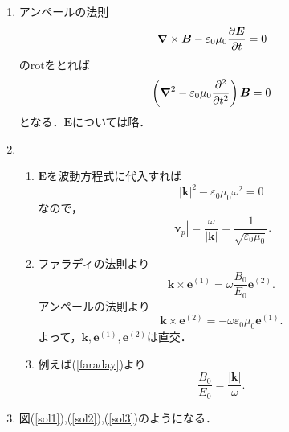 \documentclass[a4paper,pdflatex,ja=standard]{bxjsarticle}
\begin{document}
\begin{enumerate}
  \item 
  アンペールの法則
  \begin{equation}
    \bm{\nabla}
    \times
    \bm{B}
    -
    \varepsilon_{0}\mu_{0}
    \pdv{\bm{E}}{t}
    =
    0
  \end{equation}
  の$\text{rot}$をとれば
  \begin{equation}
    \left(  
      \bm{\nabla}^2
      -
      \varepsilon_{0}\mu_{0}
      \pdv[2]{}{t}
    \right)
    \bm{B}
    =
    0
  \end{equation}
  となる．$\bm{E}$については略．

  \item 
  \begin{enumerate}
    \item 
    $\bm{E}$を波動方程式に代入すれば
    \begin{equation}
      |\bm{k}|^2
      -
      \varepsilon_{0}\mu_{0}\omega^2
      =
      0
    \end{equation}
    なので，
    \begin{equation}
      |\bm{v}_{p}|
      =
      \frac{\omega}{|\bm{k}|}
      =
      \frac{1}{\sqrt{\varepsilon_{0}\mu_{0}}}
      .
    \end{equation}

    \item 
    ファラディの法則より
    \begin{equation}
      \bm{k}
      \times
      \bm{e}^{(1)}
      =
      \omega
      \frac{B_{0}}{E_{0}}
      \bm{e}^{(2)}
      .
      \label{faraday}
    \end{equation}
    アンペールの法則より
    \begin{equation}
      \bm{k}
      \times
      \bm{e}^{(2)}
      =
      -
      \omega\varepsilon_{0}\mu_{0}
      \bm{e}^{(1)}
      .
    \end{equation}
    よって，$\bm{k},\bm{e}^{(1)},\bm{e}^{(2)}$は直交．

    \item 
    例えば(\ref{faraday})より
    \begin{equation}
      \frac{B_{0}}{E_{0}}
      =
      \frac{|\bm{k}|}{\omega}
      .
    \end{equation}

  \end{enumerate}

  \item 
  図(\ref{sol1}),(\ref{sol2}),(\ref{sol3})のようになる．


\end{enumerate}
\end{document}
